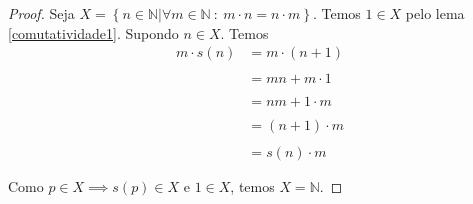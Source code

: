 \documentclass{article}
\theoremstyle{plain}
\theoremstyle{definition}
\theoremstyle{remark}
\begin{document}
\begin{proof}
	Seja $X = \left\{n \in \mathbb{N} | \forall m \in \mathbb{N} \: : \:  m\cdot n = n\cdot m  \right\}$. Temos $1\in X$ pelo lema \ref{comutatividade1}. Supondo $n\in X$. Temos 
	 \begin{align*}
		 m\cdot s(n) &= m\cdot(n +1 )  \\~\\
		 &=mn + m\cdot1 \\~\\
		 &=nm + 1\cdot m \\~\\
		 &=(n+1)\cdot m  \\~\\
		 &=s(n)\cdot m \\~\\
	\end{align*}
	Como $p\in X\implies s(p) \in X $ e $1\in X$, temos $X = \mathbb{N}$.
\end{proof}
\end{document}
